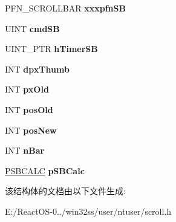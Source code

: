 \begin{DoxyCompactItemize}
P\+F\+N\+\_\+\+S\+C\+R\+O\+L\+L\+B\+AR {\bfseries xxxpfn\+SB}
\item 
\mbox{\label{structtag_s_b_t_r_a_c_k_a8131bc7d1a28443ca1e73f549fc0e7de}} 
U\+I\+NT {\bfseries cmd\+SB}
\item 
\mbox{\label{structtag_s_b_t_r_a_c_k_a2469bae4aa258e443671f39b43a7c445}} 
U\+I\+N\+T\+\_\+\+P\+TR {\bfseries h\+Timer\+SB}
\item 
\mbox{\label{structtag_s_b_t_r_a_c_k_a611975d5089bac7a13410cba2de444f0}} 
I\+NT {\bfseries dpx\+Thumb}
\item 
\mbox{\label{structtag_s_b_t_r_a_c_k_accdd3a295e4544ff12f65546c2177942}} 
I\+NT {\bfseries px\+Old}
\item 
\mbox{\label{structtag_s_b_t_r_a_c_k_ab62582c13b4ba13de078d446ba11083d}} 
I\+NT {\bfseries pos\+Old}
\item 
\mbox{\label{structtag_s_b_t_r_a_c_k_af562427c08bafa11988c38b014dab162}} 
I\+NT {\bfseries pos\+New}
\item 
\mbox{\label{structtag_s_b_t_r_a_c_k_a95f04cd223ad399d21aa3817961576f2}} 
I\+NT {\bfseries n\+Bar}
\item 
\mbox{\label{structtag_s_b_t_r_a_c_k_a8a819981ae4cce19b5854c3578449ed5}} 
\hyperlink{structtag_s_b_c_a_l_c}{P\+S\+B\+C\+A\+LC} {\bfseries p\+S\+B\+Calc}
\end{DoxyCompactItemize}


该结构体的文档由以下文件生成\+:\begin{DoxyCompactItemize}
\item 
E\+:/\+React\+O\+S-\/0../win32ss/user/ntuser/scroll.\+h\end{DoxyCompactItemize}
